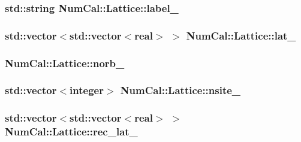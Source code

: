 \hypertarget{classNumCal_1_1Lattice_a60a503c33b250c2027631074e5ab056b}{
\subsubsection[{label\+\_\+}]{\setlength{\rightskip}{0pt plus 5cm}std\+::string Num\+Cal\+::\+Lattice\+::label\+\_\+\hspace{0.3cm}{\ttfamily [private]}}}\label{classNumCal_1_1Lattice_a60a503c33b250c2027631074e5ab056b}
\hypertarget{classNumCal_1_1Lattice_a9582cb6c2426ac63351a3e22a75f0c65}{
\subsubsection[{lat\+\_\+}]{\setlength{\rightskip}{0pt plus 5cm}std\+::vector$<$std\+::vector$<${\bf real}$>$ $>$ Num\+Cal\+::\+Lattice\+::lat\+\_\+}}\label{classNumCal_1_1Lattice_a9582cb6c2426ac63351a3e22a75f0c65}
\hypertarget{classNumCal_1_1Lattice_a97e5bc1dcbe0fa95bd53fa24136196e1}{
\subsubsection[{norb\+\_\+}]{ Num\+Cal\+::\+Lattice\+::norb\+\_\+\hspace{0.3cm}{\ttfamily [private]}}}\label{classNumCal_1_1Lattice_a97e5bc1dcbe0fa95bd53fa24136196e1}
\hypertarget{classNumCal_1_1Lattice_a19d0ca05d4b275d95e174b31e4ed1ae9}{
\subsubsection[{nsite\+\_\+}]{\setlength{\rightskip}{0pt plus 5cm}std\+::vector$<${\bf integer}$>$ Num\+Cal\+::\+Lattice\+::nsite\+\_\+\hspace{0.3cm}{\ttfamily [private]}}}\label{classNumCal_1_1Lattice_a19d0ca05d4b275d95e174b31e4ed1ae9}
\hypertarget{classNumCal_1_1Lattice_ade9b12a91ec5680d176e0daa9acdd4ab}{
\subsubsection[{rec\+\_\+lat\+\_\+}]{\setlength{\rightskip}{0pt plus 5cm}std\+::vector$<$std\+::vector$<${\bf real}$>$ $>$ Num\+Cal\+::\+Lattice\+::rec\+\_\+lat\+\_\+}}\label{classNumCal_1_1Lattice_ade9b12a91ec5680d176e0daa9acdd4ab}
